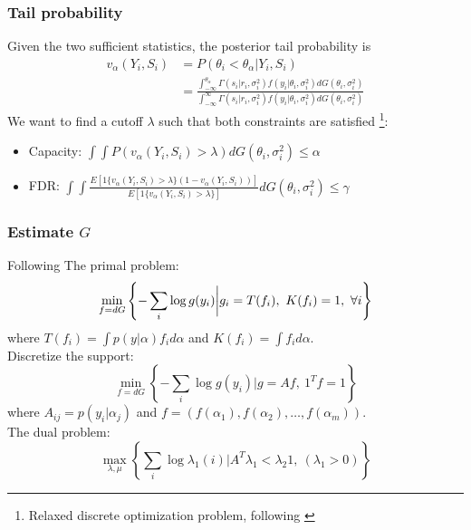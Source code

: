 \documentclass[10pt,mathserif,aspectratio=169]{beamer}
\begin{document}
\begin{frame}
  \frametitle{Tail probability}
  Given the two sufficient statistics, the posterior tail probability is
  \begin{align*}
    v_\alpha(Y_i,S_i) & = P( \theta_i < \theta_{\alpha} | Y_i,S_i)                                                                                 \\
                      & = \frac{{\int_{-\infty}^{\theta_{\alpha}} \Gamma(s_i|r_i,\sigma_i^2) f(y_i|\theta_i, \sigma_i^2) dG(\theta_i,\sigma_i^2)}}
    {{\int_{-\infty}^{\infty} \Gamma(s_i|r_i,\sigma_i^2) f(y_i|\theta_i, \sigma_i^2) dG(\theta_i,\sigma_i^2)}}
  \end{align*}
  We want to find a cutoff $\lambda$ such that both constraints are satisfied \footnote{Relaxed discrete optimization problem, following \cite{basu2018weighted}}:\\
  \begin{itemize}\itemsep=8pt
    \item Capacity: $\int \int P(v_\alpha(Y_i, S_i) > \lambda) dG(\theta_i,\sigma_i^2)
            \leq \alpha$
    \item FDR: $\int \int
            \frac{E[1\{v_\alpha(Y_i,S_i)>\lambda\}(1-v_\alpha(Y_i,S_i))]}{E[1\{v_\alpha(Y_i,S_i)>\lambda\}]}
            dG(\theta_i,\sigma_i^2) \leq \gamma$
  \end{itemize}
\end{frame}

\begin{frame}
  \frametitle{Estimate $G$}
  Following \cite{koenker2014convex,andersen2010mosek}
  The primal problem:
  \begin{equation*}
    \min_{f=dG}\left\{-\sum_i \log g(y_i)\bigg |g_i = T(f_i),\ K(f_i)=1,\ \forall i \right\}
  \end{equation*}
  where $ T(f_i)=\int p(y |\alpha)f_id\alpha $ and  $K(f_i)= \int f_i d\alpha$.\\
  Discretize the support:
  \begin{equation*}
    \min_{f=dG}\left\{-\sum_i \log g(y_i)\bigg |g=Af,\ {1^T}f=1\right\}
  \end{equation*}
  where $A_{ij}= p(y_i|\alpha_j) $ and $ f = (f(\alpha_1),f(\alpha_2),\ldots,f(\alpha_m))$.\\
  The dual problem:
  \begin{equation*}
    \max_{\lambda,\mu} \left\{ \sum_i \log \lambda_1(i) \bigg| A^T\lambda_1 < \lambda_2 1,\ (\lambda_1>0) \right\}
  \end{equation*}
\end{frame}
\end{document}
